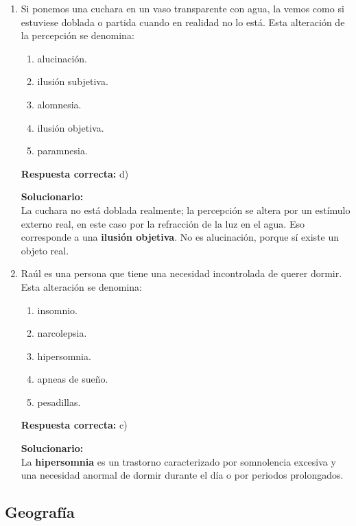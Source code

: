 \begin{enumerate}
	\vspace{6mm}
	
	\item Si ponemos una cuchara en un vaso transparente con agua, la vemos como si estuviese doblada o partida cuando en realidad no lo está. Esta alteración de la percepción se denomina:
	\begin{enumerate}[label=\alph*)]
		\item alucinación.
		\item ilusión subjetiva.
		\item alomnesia.
		\item ilusión objetiva.
		\item paramnesia.
	\end{enumerate}
	\textbf{Respuesta correcta:} d)
	
	\vspace{2mm}
	\textbf{Solucionario:}\\
	La cuchara no está doblada realmente; la percepción se altera por un estímulo externo real, en este caso por la refracción de la luz en el agua. Eso corresponde a una \textbf{ilusión objetiva}. No es alucinación, porque sí existe un objeto real.
	
	\vspace{6mm}
	
	\item Raúl es una persona que tiene una necesidad incontrolada de querer dormir. Esta alteración se denomina:
	\begin{enumerate}[label=\alph*)]
		\item insomnio.
		\item narcolepsia.
		\item hipersomnia.
		\item apneas de sueño.
		\item pesadillas.
	\end{enumerate}
	\textbf{Respuesta correcta:} c)
	
	\vspace{2mm}
	\textbf{Solucionario:}\\
	La \textbf{hipersomnia} es un trastorno caracterizado por somnolencia excesiva y una necesidad anormal de dormir durante el día o por periodos prolongados.\\

	
	\vspace{6mm}
	
\end{enumerate}

\subsection*{Geografía}

